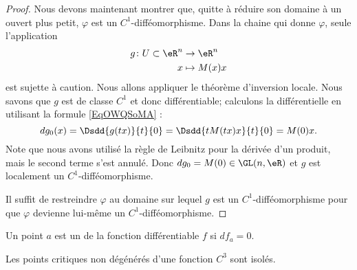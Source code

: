 \begin{proof}
    Nous devons maintenant montrer que, quitte à réduire son domaine à un ouvert plus petit, \( \varphi\) est un \( C^1\)-difféomorphisme. Dans la chaine qui donne \( \varphi\), seule l'application
    \begin{equation}
        \begin{aligned}
            g\colon U\subset \eR^n&\to \eR^n \\
            x&\mapsto M(x)x
        \end{aligned}
    \end{equation}
    est sujette à caution. Nous allons appliquer le théorème d'inversion locale. Nous savons que \( g\) est de classe \( C^1\) et donc différentiable; calculons la différentielle en utilisant la formule \eqref{EqOWQSoMA} :
    \begin{equation}
        dg_0(x)=\Dsdd{ g(tx) }{t}{0}=\Dsdd{ tM(tx)x }{t}{0}=M(0)x.
    \end{equation}
    Note que nous avons utilisé la règle de Leibnitz pour la dérivée d'un produit, mais le second terme s'est annulé. Donc \( dg_0=M(0)\in \GL(n,\eR)\) et \( g\) est localement un \( C^1\)-difféomorphisme.

    Il suffit de restreindre \( \varphi\) au domaine sur lequel \( g\) est un \( C^1\)-difféomorphisme pour que \( \varphi\) devienne lui-même un \( C^1\)-difféomorphisme.

\end{proof}

\begin{definition}
    Un point \( a\) est un  de la fonction différentiable \( f\) si \( df_a=0\).
\end{definition}

\begin{corollary}
    Les points critiques non dégénérés d'une fonction \( C^3\) sont isolés.
\end{corollary}

